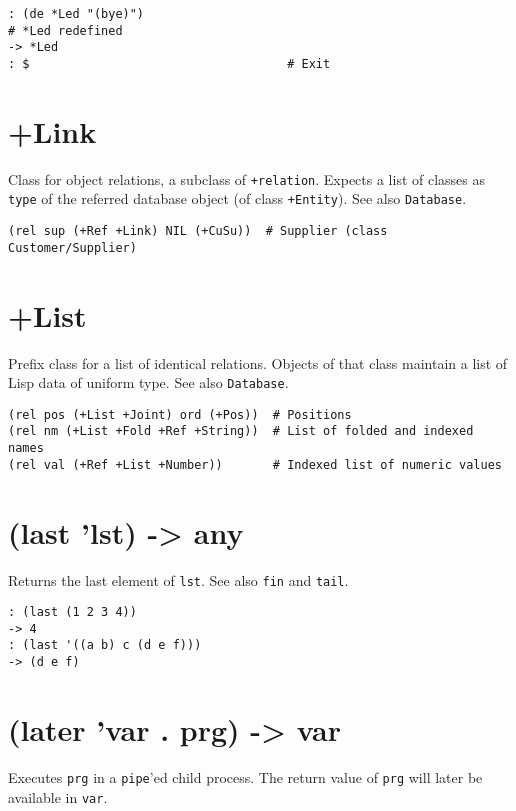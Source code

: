 {{{{{{\begin{verbatim}
: (de *Led "(bye)")
# *Led redefined
-> *Led
: $                                    # Exit
\end{verbatim}

 
\section{+Link}
\label{sec-8-1-12-2}


Class for object relations, a subclass of \texttt{+relation}. Expects a list of
classes as \texttt{type} of the referred database object (of class \texttt{+Entity}).
See also \texttt{Database}.


\begin{verbatim}
(rel sup (+Ref +Link) NIL (+CuSu))  # Supplier (class Customer/Supplier)
\end{verbatim}

 
\section{+List}
\label{sec-8-1-12-3}


Prefix class for a list of identical relations. Objects of that class
maintain a list of Lisp data of uniform type. See also \texttt{Database}.


\begin{verbatim}
(rel pos (+List +Joint) ord (+Pos))  # Positions
(rel nm (+List +Fold +Ref +String))  # List of folded and indexed names
(rel val (+Ref +List +Number))       # Indexed list of numeric values
\end{verbatim}

 
\section{(last 'lst) -> any}
\label{sec-8-1-12-4}


Returns the last element of \texttt{lst}. See also \texttt{fin} and \texttt{tail}.


\begin{verbatim}
: (last (1 2 3 4))
-> 4
: (last '((a b) c (d e f)))
-> (d e f)
\end{verbatim}

 
\section{(later 'var . prg) -> var}
\label{sec-8-1-12-5}


Executes \texttt{prg} in a \texttt{pipe}'ed child process. The return value of \texttt{prg}
will later be available in \texttt{var}.


}}}}}}

